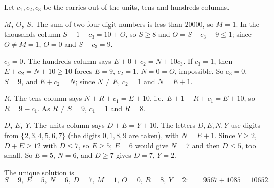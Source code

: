 Let $c_1,c_2,c_3$ be the carries out of the units, tens and hundreds columns.

\textbf{$M$, $O$, $S$.} The sum of two four-digit numbers is less than $20000$, so $M=1$. In the thousands column $S+1+c_3=10+O$, so $S\ge8$ and $O=S+c_3-9\le1$; since $O\ne M=1$, $O=0$ and $S+c_3=9$.

\textbf{$c_3=0$.} The hundreds column says $E+0+c_2=N+10c_3$. If $c_3=1$, then $E+c_2=N+10\ge10$ forces $E=9$, $c_2=1$, $N=0=O$, impossible. So $c_3=0$, $S=9$, and $E+c_2=N$; since $N\ne E$, $c_2=1$ and $N=E+1$.

\textbf{$R$.} The tens column says $N+R+c_1=E+10$, i.e.\ $E+1+R+c_1=E+10$, so $R=9-c_1$. As $R\ne S=9$, $c_1=1$ and $R=8$.

\textbf{$D$, $E$, $Y$.} The units column says $D+E=Y+10$. The letters $D,E,N,Y$ use digits from $\{2,3,4,5,6,7\}$ (the digits $0,1,8,9$ are taken), with $N=E+1$. Since $Y\ge2$, $D+E\ge12$ with $D\le7$, so $E\ge5$; $E=6$ would give $N=7$ and then $D\le5$, too small. So $E=5$, $N=6$, and $D\ge7$ gives $D=7$, $Y=2$.

The unique solution is
\[
S=9,\ E=5,\ N=6,\ D=7,\ M=1,\ O=0,\ R=8,\ Y=2:\qquad 9567+1085=\boxed{10652}.
\]
